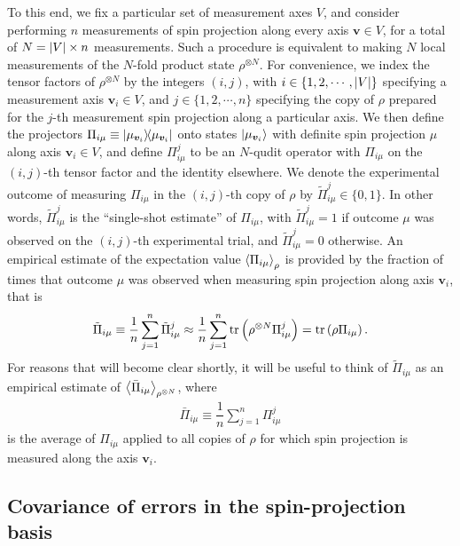 \documentclass[notitlepage,twocolumn]{revtex4-2}
\newcommand{\f}[2]{\dfrac{#1}{#2}} %
\newcommand{\p}[1]{\left(#1\right)} %
\newcommand{\bk}{\Braket} %
\renewcommand{\v}{\bm} %
\renewcommand{\set}[1]{\{#1\}} %
\newcommand{\1}{\mathds{1}}
\begin{document}
To this end, we fix a particular set of measurement axes $V$, and consider performing $n$ measurements of spin projection along every axis $\v v\in V$, for a total of $N=\abs{V}\times n$ measurements.
Such a procedure is equivalent to making $N$ local measurements of the $N$-fold product state $\rho^{\otimes N}$.
For convenience, we index the tensor factors of $\rho^{\otimes N}$ by the integers $\p{i,j}$, with $i\in\set{1,2,\cdots,\abs{V}}$ specifying a measurement axis $\v v_i\in V$, and $j\in\set{1,2,\cdots,n}$ specifying the copy of $\rho$ prepared for the $j$-th measurement spin projection along a particular axis.
We then define the projectors $\Pi_{i\mu}\equiv\op{\mu_{\v v_i}}$ onto states $\ket{\mu_{\v v_i}}$ with definite spin projection $\mu$ along axis $\v v_i\in V$, and define $\Pi_{i\mu}^j$ to be an $N$-qudit operator with $\Pi_{i\mu}$ on the $\p{i,j}$-th tensor factor and the identity elsewhere.
We denote the experimental outcome of measuring $\Pi_{i\mu}$ in the $\p{i,j}$-th copy of $\rho$ by $\tilde \Pi_{i\mu}^j\in\set{0,1}$.
In other words, $\tilde \Pi_{i\mu}^j$ is the ``single-shot estimate'' of $\Pi_{i\mu}$, with $\tilde \Pi_{i\mu}^j=1$ if outcome $\mu$ was observed on the $\p{i,j}$-th experimental trial, and $\tilde \Pi_{i\mu}^j=0$ otherwise.
An empirical estimate of the expectation value $\bk{\Pi_{i\mu}}_\rho$ is provided by the fraction of times that outcome $\mu$ was observed when measuring spin projection along axis $\v v_i$, that is
\begin{align}
  \tilde \Pi_{i\mu} \equiv \f1n \sum_{j=1}^n \tilde \Pi_{i\mu}^j
  \approx \f1n \sum_{j=1}^n \tr\p{\rho^{\otimes N} \Pi_{i\mu}^j}
  = \tr\p{\rho \Pi_{i\mu}}.
\end{align}
For reasons that will become clear shortly, it will be useful to think of $\tilde \Pi_{i\mu}$ as an empirical estimate of $\bk{\bar \Pi_{i\mu}}_{\rho^{\otimes N}}$, where
\begin{align}
  \bar \Pi_{i\mu} \equiv \f1n \sum_{j=1}^n \Pi_{i\mu}^j
  \label{eq:mean_proj}
\end{align}
is the average of $\Pi_{i\mu}$ applied to all copies of $\rho$ for which spin projection is measured along the axis $\v v_i$.

\subsection{Covariance of errors in the spin-projection basis}
\end{document}
